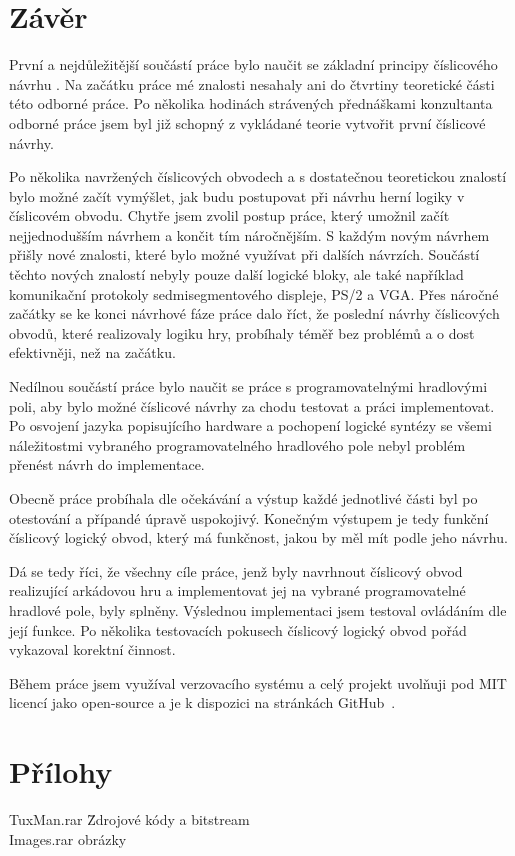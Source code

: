 \documentclass{report}
\begin{document}
 \chapter*{Závěr}
První a nejdůležitější součástí práce bylo naučit se základní principy číslicového návrhu . Na začátku práce mé znalosti nesahaly ani do čtvrtiny teoretické části této odborné práce. Po několika hodinách strávených přednáškami konzultanta odborné práce jsem byl již schopný z vykládané teorie vytvořit první číslicové návrhy. \par
Po několika navržených číslicových obvodech a s dostatečnou teoretickou znalostí bylo možné začít vymýšlet, jak budu postupovat při návrhu herní logiky v číslicovém obvodu. Chytře jsem zvolil postup práce, který umožnil začít nejjednodušším návrhem a končit tím náročnějším. S každým novým návrhem přišly nové znalosti, které bylo možné využívat při dalších návrzích. Součástí těchto nových znalostí nebyly pouze další logické bloky, ale také například komunikační protokoly sedmisegmentového displeje, PS/2 a VGA. Přes náročné začátky se ke konci návrhové fáze práce dalo říct, že poslední návrhy číslicových obvodů, které realizovaly logiku hry, probíhaly téměř bez problémů a o dost efektivněji, než na začátku. \par
 Nedílnou součástí práce bylo naučit se práce s programovatelnými hradlovými poli, aby bylo možné číslicové návrhy za chodu testovat a práci implementovat. Po osvojení jazyka popisujícího hardware a pochopení logické syntézy se všemi náležitostmi vybraného programovatelného hradlového pole nebyl problém přenést návrh do implementace. \par
Obecně práce probíhala dle očekávání a výstup každé jednotlivé části byl po otestování a přípandé úpravě uspokojivý. Konečným výstupem je tedy funkční číslicový logický obvod, který má funkčnost, jakou by měl mít podle jeho návrhu.  \par
Dá se tedy říci, že všechny cíle práce, jenž byly navrhnout číslicový obvod realizující arkádovou hru a implementovat jej na vybrané programovatelné hradlové pole,  byly splněny. Výslednou implementaci jsem testoval ovládáním dle její funkce. Po několika testovacích pokusech číslicový logický obvod pořád vykazoval korektní činnost. \par
Během práce jsem využíval verzovacího systému a celý projekt uvolňuji pod MIT licencí jako open-source a je k dispozici na stránkách GitHub~\cite{githubrepo}.




\chapter*{Přílohy}
\begin{tabbing}
    TuxMan.rar \hspace{5em} \= Zdrojové kódy a bitstream  \\
    Images.rar \>  obrázky \\
\end{tabbing}
\end{document}
